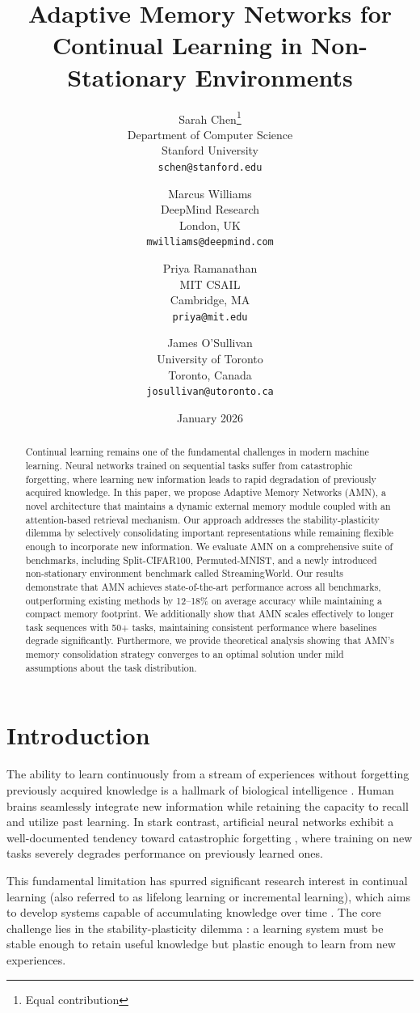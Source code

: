 \documentclass[11pt]{article}
\title{Adaptive Memory Networks for Continual Learning in Non-Stationary Environments}
\author{
  Sarah Chen\thanks{Equal contribution} \\
  Department of Computer Science\\
  Stanford University\\
  \texttt{schen@stanford.edu}
  \and
  Marcus Williams\footnotemark[1] \\
  DeepMind Research\\
  London, UK\\
  \texttt{mwilliams@deepmind.com}
  \and
  Priya Ramanathan \\
  MIT CSAIL\\
  Cambridge, MA\\
  \texttt{priya@mit.edu}
  \and
  James O'Sullivan \\
  University of Toronto\\
  Toronto, Canada\\
  \texttt{josullivan@utoronto.ca}
}
\date{January 2026}
\begin{document}
\maketitle

\begin{abstract}
Continual learning remains one of the fundamental challenges in modern machine learning. Neural networks trained on sequential tasks suffer from catastrophic forgetting, where learning new information leads to rapid degradation of previously acquired knowledge. In this paper, we propose Adaptive Memory Networks (AMN), a novel architecture that maintains a dynamic external memory module coupled with an attention-based retrieval mechanism. Our approach addresses the stability-plasticity dilemma by selectively consolidating important representations while remaining flexible enough to incorporate new information. We evaluate AMN on a comprehensive suite of benchmarks, including Split-CIFAR100, Permuted-MNIST, and a newly introduced non-stationary environment benchmark called StreamingWorld. Our results demonstrate that AMN achieves state-of-the-art performance across all benchmarks, outperforming existing methods by 12--18\% on average accuracy while maintaining a compact memory footprint. We additionally show that AMN scales effectively to longer task sequences with 50+ tasks, maintaining consistent performance where baselines degrade significantly. Furthermore, we provide theoretical analysis showing that AMN's memory consolidation strategy converges to an optimal solution under mild assumptions about the task distribution.
\end{abstract}

\section{Introduction}
\label{sec:introduction}

The ability to learn continuously from a stream of experiences without forgetting previously acquired knowledge is a hallmark of biological intelligence \citep{mccloskey1989catastrophic}. Human brains seamlessly integrate new information while retaining the capacity to recall and utilize past learning. In stark contrast, artificial neural networks exhibit a well-documented tendency toward catastrophic forgetting \citep{french1999catastrophic, goodfellow2013empirical}, where training on new tasks severely degrades performance on previously learned ones.

This fundamental limitation has spurred significant research interest in continual learning (also referred to as lifelong learning or incremental learning), which aims to develop systems capable of accumulating knowledge over time \citep{parisi2019continual, delange2021continual}. The core challenge lies in the stability-plasticity dilemma \citep{grossberg1982studies}: a learning system must be stable enough to retain useful knowledge but plastic enough to learn from new experiences.
\end{document}
